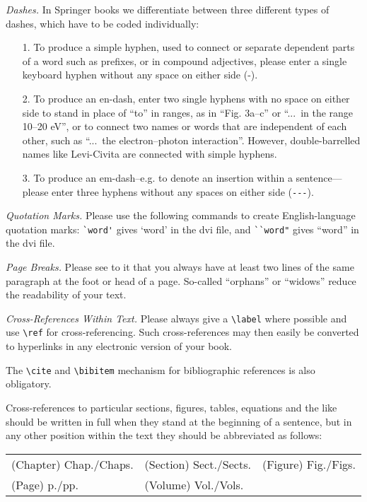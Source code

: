 \documentclass[graybox]{svmono}
\begin{document}
{\it Dashes.} In Springer books we differentiate between three different types of dashes, which have to be coded individually:

\begin{enumerate}
\item[1.] To produce a simple hyphen, used to connect or separate dependent parts of a word such as prefixes, or in compound adjectives, please enter a single keyboard hyphen without any space on either side (-).
\item[2.] To produce an en-dash, enter two single hyphens with no space on either side to stand in place of ``to'' in ranges, as in ``Fig. 3a--c'' or ``...~in the range 10--20 eV'', or to connect two names or words that are independent of each other, such as ``...~the electron--photon interaction''. However, double-barrelled names like Levi-Civita are connected with simple hyphens.
\item[3.] To produce an em-dash--e.g. to denote an insertion within a sentence---please enter three hyphens without any spaces on either side (\verb|---|).
\end{enumerate}


{\it Quotation Marks.} Please use the following commands to create English-language quotation marks: \verb|`word'| gives `word' in the dvi file, and \verb|``word"| gives ``word'' in the dvi file.

{\it Page Breaks.} Please see to it that you always have at least two lines of the same paragraph at the foot or head of a page. So-called ``orphans'' or ``widows'' reduce the readability of your text.

{\it Cross-References Within Text.} Please always give a \verb|\label| where possible and use \verb|\ref| for cross-referencing. Such cross-references may then easily be converted to hyperlinks in any electronic version of your book.

The \verb|\cite| and \verb|\bibitem| mechanism for bibliographic references is also obligatory.

Cross-references to particular sections, figures, tables, equations and the like should be written in full when they stand at the beginning of a sentence, but in any other position within the text they should be abbreviated as follows:

\begin{tabular}{l@{\quad}l@{\quad}l}
(Chapter) Chap./Chaps. & (Section) Sect./Sects. & (Figure) Fig./Figs. \\
(Page) p./pp. & (Volume) Vol./Vols.
\end{tabular}
\end{document}
